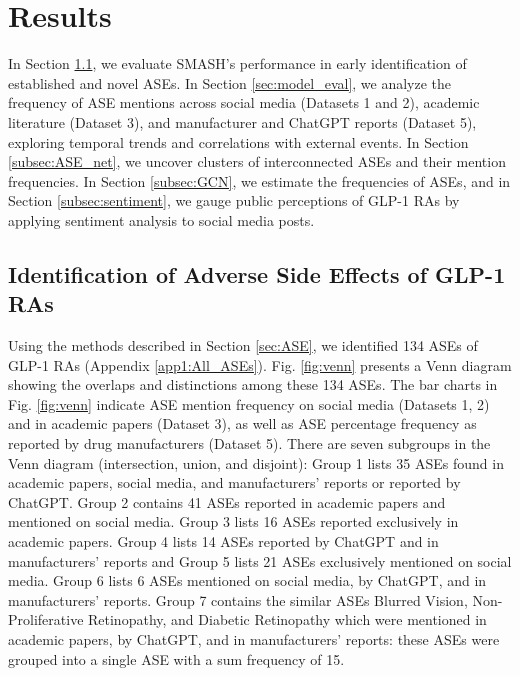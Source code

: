 \documentclass[referee,bst/sn-basic]{sn-jnl}%
\theoremstyle{thmstyletwo}%
\theoremstyle{thmstylethree}%
\begin{document}
\section{Results}
\label{sec:res}
In Section \ref{subsec:res_ASE}, we evaluate SMASH's performance in early identification of established and novel ASEs.
In Section \ref{sec:model_eval}, we analyze the frequency of ASE mentions across social media (Datasets 1 and 2), academic literature (Dataset 3), and manufacturer and ChatGPT reports (Dataset 5), exploring temporal trends and correlations with external events.
In Section \ref{subsec:ASE_net}, we uncover clusters of interconnected ASEs and their mention frequencies. 
In Section \ref{subsec:GCN}, we estimate the frequencies of ASEs, and in Section \ref{subsec:sentiment}, we gauge public perceptions of GLP-1 RAs by applying sentiment analysis to social media posts.

\subsection{Identification of Adverse Side Effects of GLP-1 RAs} 
\label{subsec:res_ASE}
Using the methods described in Section \ref{sec:ASE}, we identified 134 ASEs of GLP-1 RAs (Appendix \ref{app1:All_ASEs}).
Fig. \ref{fig:venn} presents a Venn diagram showing the overlaps and distinctions among these 134 ASEs.
The bar charts in Fig. \ref{fig:venn} indicate ASE mention frequency on social media (Datasets 1, 2) and in academic papers (Dataset 3), as well as ASE percentage frequency as reported by drug manufacturers (Dataset 5).
There are seven subgroups in the Venn diagram (intersection, union, and disjoint):
Group 1 lists 35 ASEs found in academic papers, social media, and manufacturers' reports or reported by ChatGPT.
Group 2 contains 41 ASEs reported in academic papers and mentioned on social media.
Group 3 lists 16 ASEs reported exclusively in academic papers.
Group 4 lists 14 ASEs reported by ChatGPT and in manufacturers' reports and 
Group 5 lists 21 ASEs exclusively mentioned on social media.
Group 6 lists 6 ASEs mentioned on social media, by ChatGPT, and in manufacturers' reports. 
Group 7 contains the similar ASEs Blurred Vision, Non-Proliferative Retinopathy, and Diabetic Retinopathy which were mentioned in academic papers, by ChatGPT, and in manufacturers’ reports: these ASEs were grouped into a single ASE with a sum frequency of 15.
\end{document}

